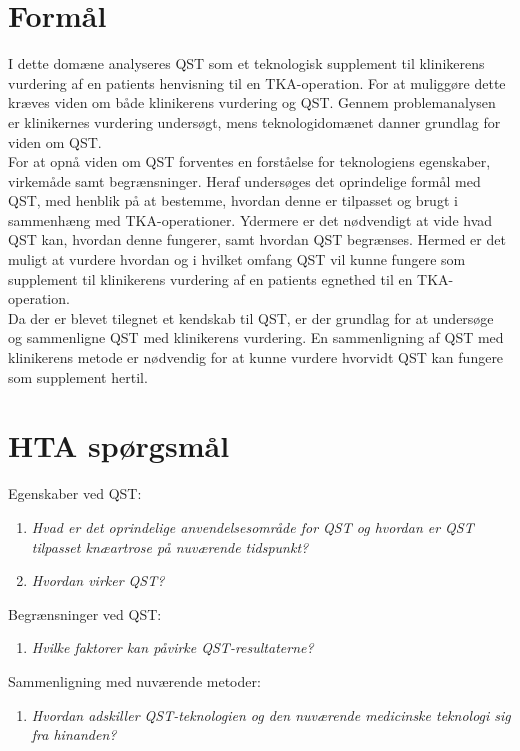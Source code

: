 \section{Formål} 
I dette domæne analyseres QST som et teknologisk supplement til klinikerens vurdering af en patients henvisning til en TKA-operation. For at muliggøre dette kræves viden om både klinikerens vurdering og QST. Gennem problemanalysen er klinikernes vurdering undersøgt, mens teknologidomænet danner grundlag for viden om QST.\\
For at opnå viden om QST forventes en forståelse for teknologiens egenskaber, virkemåde samt begrænsninger. Heraf undersøges det oprindelige formål med QST, med henblik på at bestemme, hvordan denne er tilpasset og brugt i sammenhæng med TKA-operationer. Ydermere er det nødvendigt at vide hvad QST kan, hvordan denne fungerer, samt hvordan QST begrænses. Hermed er det muligt at vurdere hvordan og i hvilket omfang QST vil kunne fungere som supplement til klinikerens vurdering af en patients egnethed til en TKA-operation.\\
Da der er blevet tilegnet et kendskab til QST, er der grundlag for at undersøge og sammenligne QST med klinikerens vurdering. En sammenligning af QST med klinikerens metode er nødvendig for at kunne vurdere hvorvidt QST kan fungere som supplement hertil. 

\section{HTA spørgsmål}
Egenskaber ved QST:
\begin{enumerate}
	\item \textit{Hvad er det oprindelige anvendelsesområde for QST og hvordan er QST tilpasset knæartrose på nuværende tidspunkt?} %
	\item \textit{Hvordan virker QST?}  %
\end{enumerate}
Begrænsninger ved QST:
\begin{enumerate}[resume]
	\item \textit{Hvilke faktorer kan påvirke QST-resultaterne?}
\end{enumerate}
Sammenligning med nuværende metoder:
\begin{enumerate}[resume]
	\item \textit{Hvordan adskiller QST-teknologien og den nuværende medicinske teknologi sig fra hinanden?} %
\end{enumerate}

